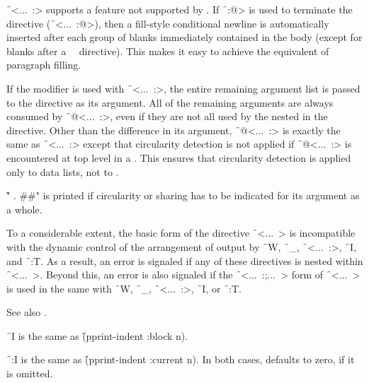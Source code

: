 \f{~<...~:>} supports a feature not supported by .
If \f{~:@>} is used to terminate the directive (\ie \f{~<...~:@>}), 
then a fill-style conditional newline is automatically inserted after each
group of blanks immediately contained in the body (except for blanks
after a ~\NewlineChar\ directive).  This makes it easy to achieve the
equivalent of paragraph filling.
 
If the  modifier is used with \f{~<...~:>}, the entire remaining argument
list is passed to the directive as its argument.  All of the remaining
arguments are always consumed by \f{~@<...~:>}, even if they are not all used
by the  nested in the directive.  Other than the difference in
its argument, \f{~@<...~:>} is exactly the same as \f{~<...~:>} except that
circularity detection is not applied if \f{~@<...~:>} is encountered at top
level in a .  This ensures that circularity detection is
applied only to data lists, not to  .

\f{" . \#\#"} is printed if circularity or sharing has to be indicated
for its argument as a whole.
 
To a considerable extent, the basic form of the directive \f{~<...~>} is
incompatible with the dynamic control of the arrangement of output by
\f{~W}, \f{~_}, \f{~<...~:>}, \f{~I}, and \f{~:T}.  As a result, an error 
is signaled if any of these directives is nested within \f{~<...~>}.  
Beyond this, an error is also signaled if the \f{~<...~:;...~>} form of
\f{~<...~>} is used in the same  with 
\f{~W}, \f{~_}, \f{~<...~:>}, \f{~I}, or \f{~:T}.
 
See also \secref\TildeLessThanJustification.

\endsubsubsection%

 
\f{~I}  is the same as \f{(pprint-indent :block n)}.

\f{~:I} is the same as \f{(pprint-indent :current n)}.
In both cases,  defaults to zero, if it is omitted.
 
\endsubsubsection%


